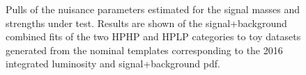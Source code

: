 \begin{figure}[h!]
\caption{Pulls of the nuisance parameters estimated for the signal masses and strengths under test. Results are shown of the signal+background combined fits of the two HPHP and HPLP categories to toy datasets generated from the nominal  templates corresponding to the 2016 integrated luminosity and signal+background pdf.}
\label{fig:pullsTheta}
\end{figure}
\clearpage

